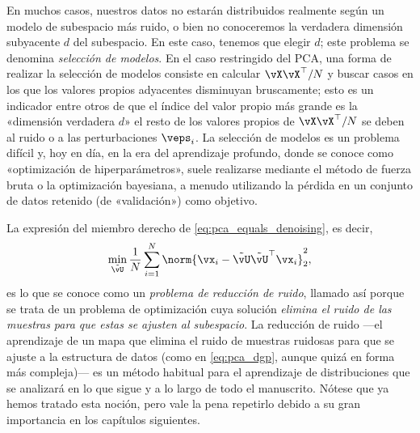 \documentclass[../../book-main.tex]{subfiles}
\begin{document}
\begin{remark}
    En muchos casos, nuestros datos no estarán distribuidos realmente
    según un modelo de subespacio más ruido, o bien no conoceremos la
    verdadera dimensión subyacente \(d\) del subespacio. En este caso,
    tenemos que elegir \(d\); este problema se denomina \textit{selección
    de modelos}. En el caso restringido del PCA, una forma de realizar
    la selección de modelos consiste en calcular \(\vX\vX^{\top}/N\) y buscar
    casos en los que los valores propios adyacentes disminuyan bruscamente; esto es
    un indicador entre otros de que el índice del valor propio más grande es la
    «dimensión verdadera \(d\)» el resto de los valores propios de
    \(\vX\vX^{\top}/N\) se deben al ruido o a las perturbaciones
    \(\veps_{i}\). La selección de modelos es un problema difícil y,
    hoy en día, en la era del aprendizaje profundo, donde se conoce como
    «optimización de hiperparámetros», suele realizarse mediante el método de fuerza bruta
    o la optimización bayesiana, a menudo utilizando la pérdida en un conjunto de datos retenido (de
    «validación») como objetivo. %
\end{remark}

\begin{remark}
    La expresión del miembro derecho de 
    \eqref{eq:pca_equals_denoising}, es decir,
    \begin{equation}\label{eq:orthogonal_denoising}
        \min_{\tilde{\vU}}\frac{1}{N}\sum_{i = 1}^{N}\norm{\vx_{i} -
        \tilde{\vU}\tilde{\vU}^{\top}\vx_{i}}_{2}^{2},
    \end{equation}
    es lo que se conoce como un \textit{problema de reducción de ruido}, llamado así
    porque se trata de un problema de optimización cuya solución
    \textit{elimina el ruido de las muestras para que estas se ajusten al
    subespacio}. La reducción de ruido ---el aprendizaje de un mapa que elimina el ruido de
    muestras ruidosas para que se ajuste a la estructura de datos (como en
    \eqref{eq:pca_dgp}, aunque quizá en forma más compleja)--- es un método habitual
    para el aprendizaje de distribuciones que se analizará en lo que sigue
    y a lo largo de todo el manuscrito. Nótese que ya hemos
    tratado esta noción, pero vale la pena repetirlo debido a su gran
    importancia en los capítulos siguientes.
\end{remark}
\end{document}
